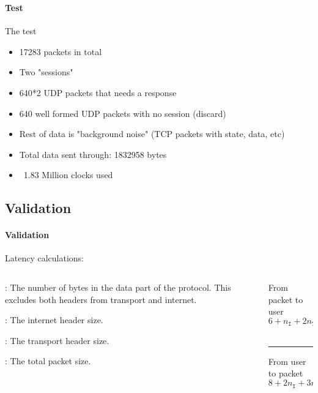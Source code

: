 \begin{frame}%
    \frametitle{\EvaluationTitle}
    \framesubtitle{Test}
    The test
    \begin{itemize}%
        \item 17283 packets in total
        \item Two "sessions"
        \item 640*2 UDP packets that needs a response
        \item 640 well formed UDP packets with no session (discard)
        \item Rest of data is "background noise" (TCP packets with state, data, etc)
        \item Total data sent through: 1832958 bytes
        \item ~1.83 Million clocks used
    \end{itemize}
\end{frame}

\begin{frame}%
    \frametitle{\EvaluationTitle}
    \subsection{Validation}
    \framesubtitle{Validation}
    Latency calculations:
    \begin{columns}
        \begin{column}{0.60\textwidth}
            \begin{description}[$n_{\mathtt{T}}$]
                \item[$n_{\mathtt{D}}$]:
                The number of bytes in the data part of the protocol. This excludes both
                headers from transport and internet.
                \item[$n_{\mathtt{I}}$]:
                The internet header size.
                \item[$n_{\mathtt{T}}$]:
                The transport header size.
                \item[$n$]:\quad
                The total packet size.
            \end{description}
        \end{column}
        \begin{column}{0.40\textwidth}
            From packet to user
            \begin{equation*}
                6 + n_{\mathtt{I}} + 2n_{\mathtt{T}} + 3n_{\mathtt{D}}
           \end{equation*}\\
           \noindent\rule{8cm}{0.4pt}
           From user to packet
           \begin{equation*}
            8 + 2n_{\mathtt{I}} + 3n_{\mathtt{T}} + 4n_{\mathtt{D}}
            \end{equation*}
        \end{column}
    \end{columns}
\end{frame}

